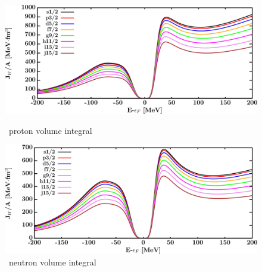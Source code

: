 \begin{figure}[hbtp]
    \centering
    \begin{minipage}{0.42\textwidth}
        \centering
        \includegraphics[width=\textwidth]{figures/sn112_protonVolumeIntegrals.png}
        \caption*{\snTwelve\ proton volume integral}
        \label{DOMFitData_sn112_proton_potentialIntegral}
    \end{minipage}\hspace{6pt}
    \begin{minipage}{0.42\textwidth}
        \centering
        \includegraphics[width=\textwidth]{figures/sn112_neutronVolumeIntegrals.png}
        \caption*{\snTwelve\ neutron volume integral}
        \label{DOMFitData_sn112_neutron_potentialIntegral}
    \end{minipage}
\end{figure}
